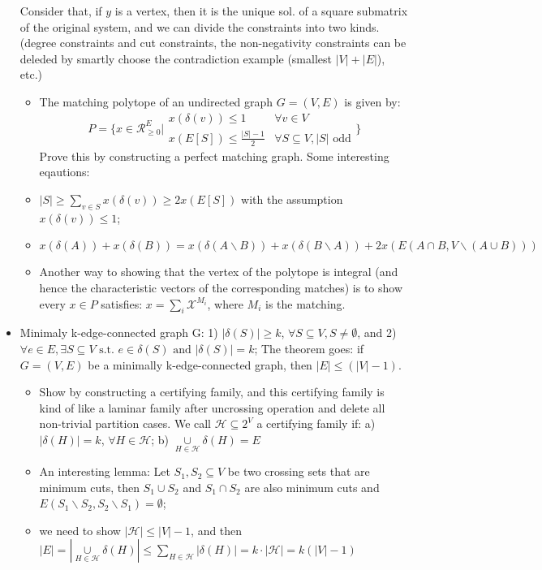 \documentclass{article}
\begin{document}
\begin{itemize}
\begin{equation*}
\end{equation*}
Consider that, if $y$ is a vertex, then it is the unique sol. of a square submatrix of the original system, and we can divide the constraints into two kinds. (degree constraints and cut constraints, the non-negativity constraints can be deleded by smartly choose the contradiction example (smallest $|V|+|E|$), etc.)
\begin{itemize}
\item The matching polytope of an undirected graph $G=(V,E)$ is given by:
\begin{equation*}
P=\Big\{x\in\mathcal{R}_{\geq 0}^E\Big| 
\begin{array}{lr}
x(\delta(v))\leq1&  \forall v\in V\\
x(E[S])\leq \frac{|S|-1}{2}&  \forall S\subseteq V, |S| \mbox{ odd}
\end{array}\Big\}
\end{equation*}
Prove this by constructing a perfect matching graph. Some interesting eqautions:
\item $|S|\geq\underset{v\in S}{\sum}x(\delta(v))\geq 2x(E[S])$ with the assumption $x(\delta(v))\leq 1$;
\item $x(\delta(A))+x(\delta(B))=x(\delta(A\backslash B))+x(\delta(B\backslash A))+2x(E(A\cap B,V\backslash(A\cup B)))$
\item Another way to showing that the vertex of the polytope is integral (and hence the characteristic vectors of the corresponding matches) is to show every $x\in P$ satisfies: $x=\underset{i}{\sum}\mathcal{X}^{M_i}$, where $M_i$  is the matching.
\end{itemize}
\item Minimaly k-edge-connected graph G: 1) $|\delta(S)|\geq k$, $\forall S\subseteq V, S\neq\emptyset$, and 2) $\forall e\in E, \exists S\subseteq V \text{ s.t. } e\in \delta(S) \text{ and } |\delta(S)|=k$; The theorem goes: if $G=(V,E)$ be a minimally k-edge-connected graph, then $|E|\leq (|V|-1)$. 
\begin{itemize}
\item Show by constructing a certifying family, and this certifying family is kind of like a laminar family after uncrossing operation and delete all non-trivial partition cases. We call $\mathcal{H}\subseteq 2^V$ a certifying family if: a) $|\delta(H)|=k$, $\forall H\in\mathcal{H}$; b) $\underset{H\in\mathcal{H}}{\cup}\delta(H)=E$
\item An interesting lemma: Let $S_1,S_2\subseteq V$ be two crossing sets that are minimum cuts, then $S_1\cup S_2$ and $S_1\cap S_2$ are also minimum cuts and $E(S_1\backslash S_2,S_2\backslash S_1)=\emptyset$;
\item we need to show $|\mathcal{H}|\leq |V|-1$, and then $|E|=|\underset{H\in\mathcal{H}}{\cup}\delta(H)|\leq\underset{H\in\mathcal{H}}{\sum}|\delta(H)|=k\cdot|\mathcal{H}|=k(|V|-1)$
\end{itemize}
\end{itemize}
\end{document}
